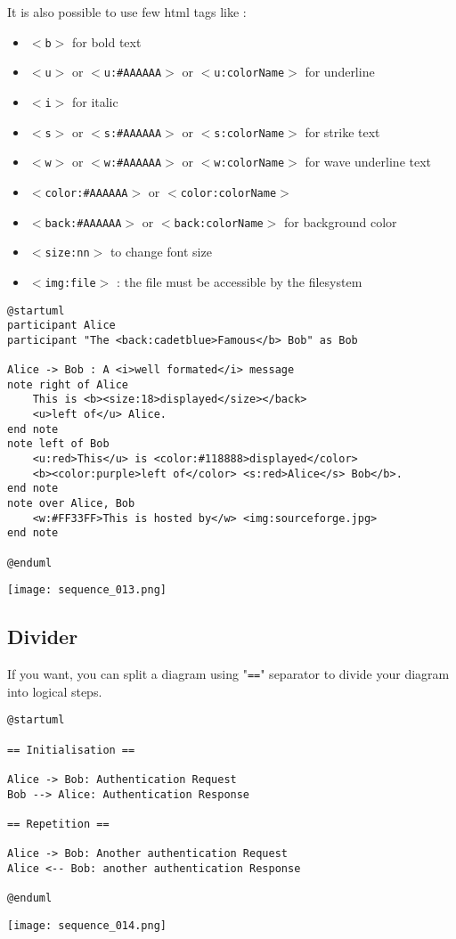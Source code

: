 It is also possible to use few html tags like :
\begin{itemize}
\item \texttt{$<$b$>$} for bold text
\item \texttt{$<$u$>$} or \texttt{$<$u:\#AAAAAA$>$} or
\texttt{$<$u:colorName$>$} for underline
\item \texttt{$<$i$>$} for italic
\item \texttt{$<$s$>$} or \texttt{$<$s:\#AAAAAA$>$} or
\texttt{$<$s:colorName$>$} for strike text
\item \texttt{$<$w$>$} or \texttt{$<$w:\#AAAAAA$>$} or
\texttt{$<$w:colorName$>$} for wave underline text
\item \texttt{$<$color:\#AAAAAA$>$} or \texttt{$<$color:colorName$>$}
\item \texttt{$<$back:\#AAAAAA$>$} or \texttt{$<$back:colorName$>$} for
background color
\item \texttt{$<$size:nn$>$} to change font size
\item \texttt{$<$img:file$>$} : the file
must be accessible by the filesystem
\end{itemize}

\begin{lstlisting}
@startuml
participant Alice
participant "The <back:cadetblue>Famous</b> Bob" as Bob

Alice -> Bob : A <i>well formated</i> message
note right of Alice 
	This is <b><size:18>displayed</size></back> 
	<u>left of</u> Alice. 
end note
note left of Bob 
	<u:red>This</u> is <color:#118888>displayed</color> 
	<b><color:purple>left of</color> <s:red>Alice</s> Bob</b>. 
end note
note over Alice, Bob
	<w:#FF33FF>This is hosted by</w> <img:sourceforge.jpg>
end note
 
@enduml
\end{lstlisting}
\begin{center}
\texttt{[image: sequence\_013.png]}
\end{center}

		

\newpage \subsection{Divider}

If you want, you can split a diagram using "\texttt{==}" separator to divide your diagram into logical steps.

\begin{lstlisting}
@startuml

== Initialisation ==

Alice -> Bob: Authentication Request
Bob --> Alice: Authentication Response

== Repetition ==

Alice -> Bob: Another authentication Request
Alice <-- Bob: another authentication Response

@enduml
\end{lstlisting}
\begin{center}
\texttt{[image: sequence\_014.png]}
\end{center}


